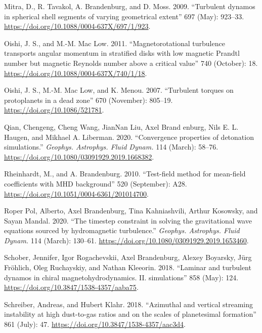 \documentclass[10pt,a4paper,onecolumn]{article}
\begin{document}
\leavevmode\hypertarget{ref-2009ApJ.697.923M}{}%
Mitra, D., R. Tavakol, A. Brandenburg, and D. Moss. 2009. ``Turbulent
dynamos in spherical shell segments of varying geometrical extent'' 697
(May): 923--33. \url{https://doi.org/10.1088/0004-637X/697/1/923}.

\leavevmode\hypertarget{ref-2011ApJ.740.18O}{}%
Oishi, J. S., and M.-M. Mac Low. 2011. ``Magnetorotational turbulence
transports angular momentum in stratified disks with low magnetic
Prandtl number but magnetic Reynolds number above a critical value'' 740
(October): 18. \url{https://doi.org/10.1088/0004-637X/740/1/18}.

\leavevmode\hypertarget{ref-2007ApJ.670.805O}{}%
Oishi, J. S., M.-M. Mac Low, and K. Menou. 2007. ``Turbulent torques on
protoplanets in a dead zone'' 670 (November): 805--19.
\url{https://doi.org/10.1086/521781}.

\leavevmode\hypertarget{ref-2020GApFD.114.58Q}{}%
Qian, Chengeng, Cheng Wang, JianNan Liu, Axel Brand enburg, Nils E. L.
Haugen, and Mikhael A. Liberman. 2020. ``Convergence properties of
detonation simulations.'' \emph{Geophys. Astrophys. Fluid Dynam.} 114
(March): 58--76. \url{https://doi.org/10.1080/03091929.2019.1668382}.

\leavevmode\hypertarget{ref-2010Aux5cux26A.520A.28R}{}%
Rheinhardt, M., and A. Brandenburg. 2010. ``Test-field method for
mean-field coefficients with MHD background'' 520 (September): A28.
\url{https://doi.org/10.1051/0004-6361/201014700}.

\leavevmode\hypertarget{ref-2020GApFD.114.130R}{}%
Roper Pol, Alberto, Axel Brandenburg, Tina Kahniashvili, Arthur
Kosowsky, and Sayan Mandal. 2020. ``The timestep constraint in solving
the gravitational wave equations sourced by hydromagnetic turbulence.''
\emph{Geophys. Astrophys. Fluid Dynam.} 114 (March): 130--61.
\url{https://doi.org/10.1080/03091929.2019.1653460}.

\leavevmode\hypertarget{ref-2018ApJ.858.124S}{}%
Schober, Jennifer, Igor Rogachevskii, Axel Brandenburg, Alexey Boyarsky,
Jürg Fröhlich, Oleg Ruchayskiy, and Nathan Kleeorin. 2018. ``Laminar and
turbulent dynamos in chiral magnetohydrodynamics. II. simulations'' 858
(May): 124. \url{https://doi.org/10.3847/1538-4357/aaba75}.

\leavevmode\hypertarget{ref-2018ApJ.861.47S}{}%
Schreiber, Andreas, and Hubert Klahr. 2018. ``Azimuthal and vertical
streaming instability at high dust-to-gas ratios and on the scales of
planetesimal formation'' 861 (July): 47.
\url{https://doi.org/10.3847/1538-4357/aac3d4}.
\end{document}
